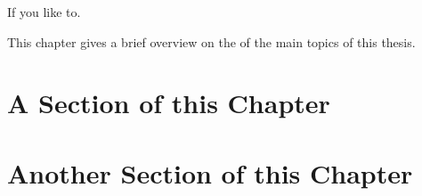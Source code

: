 
       {If you like to.}

This chapter gives a brief overview on the \SOTA of the main topics of this thesis.

\chapterSupportedBy{\sotaCitesLong}




\section{A Section of this Chapter}
\label{sec:sota:ASection}
%

\section{Another Section of this Chapter}
\label{sec:sota:AnotherSection}
%